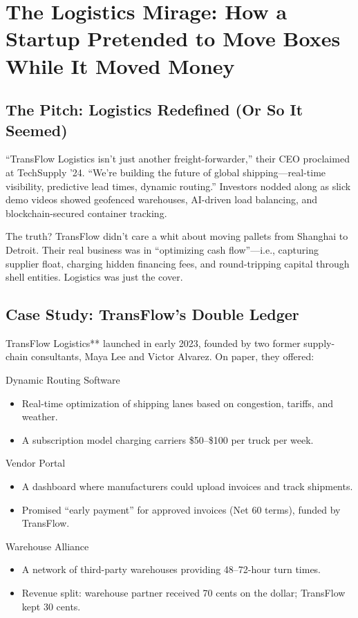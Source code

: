 \section{The Logistics Mirage: How a Startup Pretended to Move Boxes While It Moved Money}


\subsection{The Pitch: Logistics Redefined (Or So It Seemed)}

“TransFlow Logistics isn’t just another freight-forwarder,” their CEO proclaimed at TechSupply ’24. “We’re building the future of global shipping—real-time visibility, predictive lead times, dynamic routing.” Investors nodded along as slick demo videos showed geofenced warehouses, AI-driven load balancing, and blockchain-secured container tracking.

The truth? TransFlow didn’t care a whit about moving pallets from Shanghai to Detroit. Their real business was in “optimizing cash flow”—i.e., capturing supplier float, charging hidden financing fees, and round-tripping capital through shell entities. Logistics was just the cover.

\subsection{Case Study: TransFlow’s Double Ledger}

TransFlow Logistics** launched in early 2023, founded by two former supply-chain consultants, Maya Lee and Victor Alvarez. On paper, they offered:

Dynamic Routing Software
\begin{itemize}
   \item  Real-time optimization of shipping lanes based on congestion, tariffs, and weather.
   \item  A subscription model charging carriers \$50–\$100 per truck per week.
\end{itemize}

Vendor Portal
\begin{itemize}
   \item A dashboard where manufacturers could upload invoices and track shipments.
   \item  Promised “early payment” for approved invoices (Net 60 terms), funded by TransFlow.
\end{itemize}

Warehouse Alliance
\begin{itemize}
   \item A network of third-party warehouses providing 48–72-hour turn times.
   \item  Revenue split: warehouse partner received 70 cents on the dollar; TransFlow kept 30 cents.
\end{itemize}

